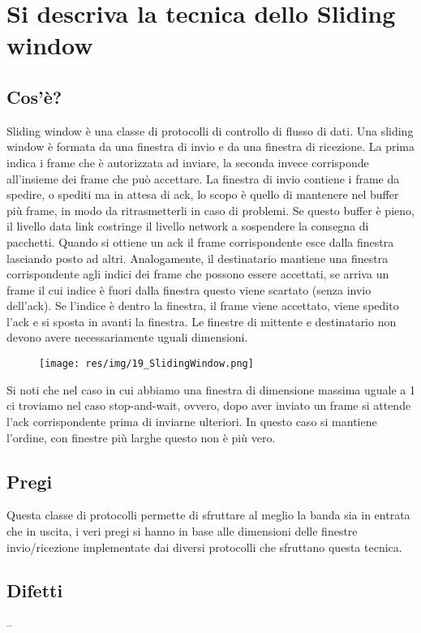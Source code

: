 \section{Si descriva la tecnica dello Sliding window}
\subsection{Cos'è?}
Sliding window è una classe di protocolli di controllo di flusso di dati.
Una sliding window è formata da una finestra di invio e da una finestra di ricezione.
La prima indica i frame che è autorizzata ad inviare, la seconda invece corrisponde all'insieme dei frame che può accettare.
La finestra di invio contiene i frame da spedire, o spediti ma in attesa di ack, lo scopo è quello di mantenere nel buffer più frame, in modo da ritrasmetterli in caso di problemi. Se questo buffer è pieno, il livello data link costringe il livello network a sospendere la consegna di pacchetti. Quando si ottiene un ack il frame corrispondente esce dalla finestra lasciando posto ad altri.
Analogamente, il destinatario mantiene una finestra corrispondente agli indici dei frame che possono essere accettati, se arriva un frame il cui indice è fuori dalla finestra questo viene scartato (senza invio dell'ack). Se l'indice è dentro la finestra, il frame viene accettato, viene spedito l'ack e si sposta in avanti la finestra.
Le finestre di mittente e destinatario non devono avere necessariamente uguali dimensioni.

\begin{figure}[H]
\centering
\texttt{[image: res/img/19\_SlidingWindow.png]}
\end{figure}
 
Si noti che nel caso in cui abbiamo una finestra di dimensione massima uguale a 1 ci troviamo nel caso stop-and-wait, ovvero,
dopo aver inviato un frame si attende l'ack corrispondente prima di inviarne ulteriori.
In questo caso si mantiene l'ordine, con finestre più larghe questo non è più vero.

\subsection{Pregi}
Questa classe di protocolli permette di sfruttare al meglio la banda sia in entrata che in uscita, i veri pregi si hanno in base alle dimensioni delle finestre invio/ricezione implementate dai diversi protocolli che sfruttano questa tecnica.

\subsection{Difetti}
--

